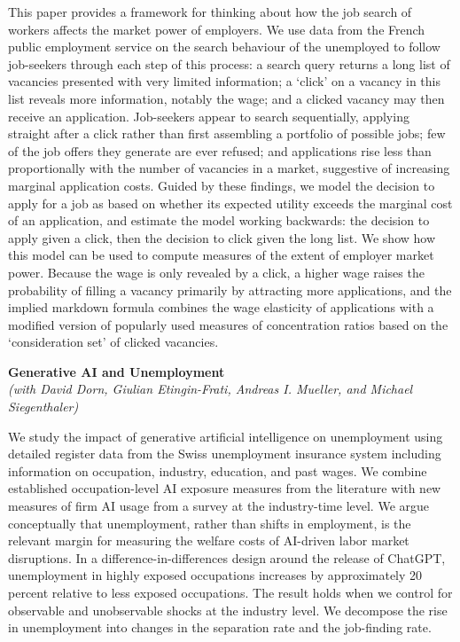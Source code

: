 \documentclass[11pt]{article}
\begin{document}
This paper provides a framework for thinking about how the job search of workers affects the market power of employers. We use data from the French public employment service on the search behaviour of the unemployed to follow job-seekers through each step of this process: a search query returns a long list of vacancies presented with very limited information; a `click' on a vacancy in this list reveals more information, notably the wage; and a clicked vacancy may then receive an application. Job-seekers appear to search sequentially, applying straight after a click rather than first assembling a portfolio of possible jobs; few of the job offers they generate are ever refused; and applications rise less than proportionally with the number of vacancies in a market, suggestive of increasing marginal application costs. Guided by these findings, we model the decision to apply for a job as based on whether its expected utility exceeds the marginal cost of an application, and estimate the model working backwards: the decision to apply given a click, then the decision to click given the long list. We show how this model can be used to compute measures of the extent of employer market power. Because the wage is only revealed by a click, a higher wage raises the probability of filling a vacancy primarily by attracting more applications, and the implied markdown formula combines the wage elasticity of applications with a modified version of popularly used measures of concentration ratios based on the `consideration set' of clicked vacancies.

\vspace{8mm}
\hypertarget{abs:genai}{}%
\begin{center}
{\Large\bfseries Generative AI and Unemployment}\\[1mm]
{\itshape (with David Dorn, Giulian Etingin-Frati, Andreas I. Mueller, and Michael Siegenthaler)}
\end{center}

We study the impact of generative artificial intelligence on unemployment using detailed register data from the Swiss unemployment insurance system including information on occupation, industry, education, and past wages. We combine established occupation-level AI exposure measures from the literature with new measures of firm AI usage from a survey at the industry-time level. We argue conceptually that unemployment, rather than shifts in employment, is the relevant margin for measuring the welfare costs of AI-driven labor market disruptions. In a difference-in-differences design around the release of ChatGPT, unemployment in highly exposed occupations increases by approximately 20 percent relative to less exposed occupations. The result holds when we control for observable and unobservable shocks at the industry level. We decompose the rise in unemployment into changes in the separation rate and the job-finding rate.
\end{document}
